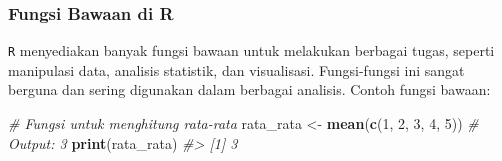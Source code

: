 \documentclass[
  oneside]{book}
\newenvironment{Shaded}{\begin{snugshade}}{\end{snugshade}}
\newcommand{\AttributeTok}[1]{\textcolor[rgb]{0.13,0.29,0.53}{#1}}
\newcommand{\CommentTok}[1]{\textcolor[rgb]{0.56,0.35,0.01}{\textit{#1}}}
\newcommand{\ControlFlowTok}[1]{\textcolor[rgb]{0.13,0.29,0.53}{\textbf{#1}}}
\newcommand{\DecValTok}[1]{\textcolor[rgb]{0.00,0.00,0.81}{#1}}
\newcommand{\FunctionTok}[1]{\textcolor[rgb]{0.13,0.29,0.53}{\textbf{#1}}}
\newcommand{\NormalTok}[1]{#1}
\newcommand{\OtherTok}[1]{\textcolor[rgb]{0.56,0.35,0.01}{#1}}
\newcommand{\SpecialCharTok}[1]{\textcolor[rgb]{0.81,0.36,0.00}{\textbf{#1}}}
\begin{document}
\begin{Shaded}
\end{Shaded}

\begin{Shaded}
\end{Shaded}

\subsubsection*{Fungsi Bawaan di R}\label{fungsi-bawaan-di-r}

\texttt{R} menyediakan banyak fungsi bawaan untuk melakukan berbagai tugas, seperti manipulasi data, analisis statistik, dan visualisasi. Fungsi-fungsi ini sangat berguna dan sering digunakan dalam berbagai analisis. Contoh fungsi bawaan:

\begin{Shaded}
\begin{Highlighting}[]
\CommentTok{\# Fungsi untuk menghitung rata{-}rata}
\NormalTok{rata\_rata }\OtherTok{\textless{}{-}} \FunctionTok{mean}\NormalTok{(}\FunctionTok{c}\NormalTok{(}\DecValTok{1}\NormalTok{, }\DecValTok{2}\NormalTok{, }\DecValTok{3}\NormalTok{, }\DecValTok{4}\NormalTok{, }\DecValTok{5}\NormalTok{))  }\CommentTok{\# Output: 3}
\FunctionTok{print}\NormalTok{(rata\_rata)}
\CommentTok{\#\textgreater{} [1] 3}
\end{Highlighting}
\end{Shaded}
\end{document}
